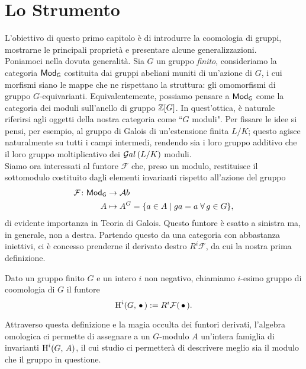 \chapter{Lo Strumento}


L'obiettivo di questo primo capitolo è di introdurre la coomologia di gruppi, mostrarne le principali proprietà e presentare alcune generalizzazioni.\\

Poniamoci nella dovuta generalità. Sia $ G $ un gruppo \emph{finito}, consideriamo la categoria $ \mathsf{Mod}_\mathsf{G} $ costituita dai gruppi abeliani muniti di un'azione di $ G $, i cui morfismi siano le mappe che ne rispettano la struttura: gli omomorfismi di gruppo $ G $-equivarianti. Equivalentemente, possiamo pensare a $ \mathsf{Mod}_\mathsf{G} $ come la categoria dei moduli sull'anello di gruppo $ \mathbb{Z}[G] $. In quest'ottica, è naturale riferirsi agli oggetti della nostra categoria come \textquotedblleft$ G $ moduli".
Per fissare le idee si pensi, per esempio, al gruppo di Galois di un'estensione finita $ L/K $; questo agisce naturalmente su tutti i campi intermedi, rendendo sia i loro gruppo additivo che il loro gruppo moltiplicativo dei $ \mathcal{G}al\left( L/K \right) $ moduli. \\

Siamo ora interessati al funtore $ \mathcal{F} $ che, preso un modulo, restituisce il sottomodulo costituito dagli elementi invarianti rispetto all'azione del gruppo
\begin{align*} 
\mathcal{F} \colon \mathsf{Mod}_\mathsf{G} &\to \mathcal{A}b \\
A &\mapsto A^G = \{ a \in A \mid ga = a \; \forall \, g \in G \},
\end{align*}
di evidente importanza in Teoria di Galois. Questo funtore è esatto a sinistra ma, in generale, non a destra. Partendo questo da una categoria con abbastanza iniettivi, ci è concesso prenderne il derivato destro $ R^i\mathcal{F} $, da cui la nostra prima definizione.

\begin{definition}
	Dato un gruppo finito $ G $ e un intero $ i $ non negativo, chiamiamo $ i $-esimo gruppo di coomologia di $ G $ il funtore
	\[ \operatorname{H}^i(G, \, \bullet\,) : = R^i\mathcal{F}(\,\bullet\,). \]
\end{definition}

Attraverso questa definizione e la magia occulta dei funtori derivati, l'algebra omologica ci permette di assegnare a un $ G $-modulo $ A $ un'intera famiglia di invarianti $ \operatorname{H}^i(G, \, A) $, il cui studio ci permetterà di descrivere meglio sia il modulo che il gruppo in questione. 

